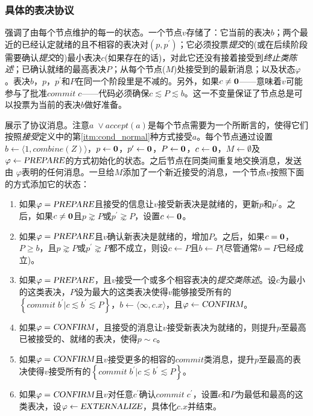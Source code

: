 \subsubsection{具体的表决协议}\label{sec:scp_nominate_concrete}

强调了由每个节点维护的每一{\slot}的状态。一个节点$v$存储了：它当前的表决$b$；两个最近的已经认定就绪的且不相容的表决对$(p,p^{\prime})$；它必须投票\textit{提交}的(或在后续阶段需要确认\textit{提交}的)最小表决$c$(如果存在的话)，对此它还没有接着接受到\textit{终止类陈述}；已确认就绪的最高表决$P$；从每个节点($M$)处接受到的最新消息；以及状态$\varphi$。表决$b$，$p$，$p^{\prime}$和$P$在同一个阶段里是不减的。另外，如果$c\neq{\bm 0}$——意味着$v$可能参与了批准$commit\;c$——代码必须确保$c\lesssim P\lesssim b$。这一不变量保证了节点总是可以投票为当前的表决$b$做好准备。

展示了协议消息。注意$a\;\vee accept(a)$是每个节点需要为一个{\quorum}所断言的，使得它们按照\textit{接受}定义中的第\ref{itm:cond_normal}种方式接受$a$。每个节点通过设置$b\leftarrow \langle 1,combine(Z)\rangle$，$p\leftarrow {\bm 0}$，$p^{\prime}\leftarrow {\bm 0}$，$P\leftarrow {\bm 0}$，$c\leftarrow {\bm 0}$，$M\leftarrow\emptyset$及$\varphi \leftarrow \textsl{PREPARE}$的方式初始化{\slot}的状态。之后节点在同类间重复地交换消息，发送由 $\varphi$表明的任何消息。一旦给$M$添加了一个新近接受的消息，一个节点$v$按照下面的方式添加它的状态：

\begin{enumerate}\label{protocal_case}
	\item 如果$\varphi = \textsl{PREPARE}$且接受的信息让$v$接受新表决是就绪的，更新$p$和$p^{\prime}$。之后，如果$c\neq {\bm 0}$且$p\gnsim P$或$p^{\prime}\gnsim P$，设置$c\leftarrow {\bm 0}$。
	\item 如果$\varphi = \textsl{PREPARE}$且$v$确认新表决是就绪的，增加$P$。之后，如果$c={\bm 0}$，$P\geq b$，且$p\gnsim P$或$p^{\prime}\gnsim P$都不成立，则设$c\leftarrow P$且$b\leftarrow P$(尽管通常$b=P$已经成立)。
	\item 如果$\varphi = \textsl{PREPARE}$，且$v$接受一个或多个相容表决的\textit{提交类陈述}。设$c$为最小的这类表决，$P$设为最大的这类表决使得$v$能够接受所有的$\left\{commit\;b^{\prime}|c\lesssim b^{\prime}\lesssim P\right\}$，$b\leftarrow \langle \infty, c.x\rangle$，且$\varphi\leftarrow \textsl{CONFIRM}$。
	\item 如果$\varphi = \textsl{CONFIRM}$，且接受的消息让$v$接受新表决为就绪的，则提升$p$至最高已被接受的、就绪的表决，使得$p\sim c$。
	\item 如果$\varphi = \textsl{CONFIRM}$且$v$接受更多的相容的$commit$类消息，提升$p$至最高的表决使得$v$接受所有的$\left\{commit\;b^{\prime}|c\lesssim b^{\prime} \lesssim P\right\}$。
	\item 如果$\varphi = \textsl{CONFIRM}$且$v$对任意$c^{\prime}$确认$commit\;c^{\prime}$，设置$c$和$P$为最低和最高的这类表决，设$\varphi\leftarrow\textsl{EXTERNALIZE}$，具体化$c.x$并结束。
\end{enumerate}

